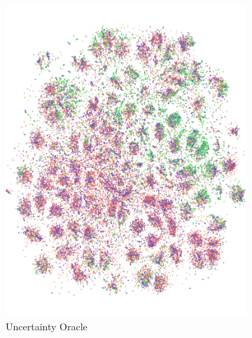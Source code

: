 \documentclass{article} %
\begin{document}
\begin{figure}[tb]
    \begin{minipage}[t]{0.49\textwidth}
  \begin{center}
    \begin{subfigure}[b]{0.49\textwidth}
		\includegraphics[width=\columnwidth]{fig1_a_1.pdf}
		\caption{Uncertainty Oracle}
    \end{subfigure}
    \begin{subfigure}[b]{0.49\textwidth}

\end{subfigure}
\end{center}
\end{minipage}
\end{figure}
\end{document}
